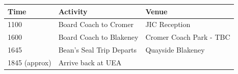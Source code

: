 \documentclass[12pt,]{book}
\theoremstyle{definition}
\theoremstyle{definition}
\theoremstyle{remark}
\begin{document}
\begin{longtable}[]{@{}lll@{}}
\toprule
\begin{minipage}[b]{0.18\columnwidth}\raggedright\strut
Time\strut
\end{minipage} & \begin{minipage}[b]{0.32\columnwidth}\raggedright\strut
Activity\strut
\end{minipage} & \begin{minipage}[b]{0.32\columnwidth}\raggedright\strut
Venue\strut
\end{minipage}\tabularnewline
\midrule
\endhead
\begin{minipage}[t]{0.18\columnwidth}\raggedright\strut
1100\strut
\end{minipage} & \begin{minipage}[t]{0.32\columnwidth}\raggedright\strut
Board Coach to Cromer\strut
\end{minipage} & \begin{minipage}[t]{0.32\columnwidth}\raggedright\strut
JIC Reception\strut
\end{minipage}\tabularnewline
\begin{minipage}[t]{0.18\columnwidth}\raggedright\strut
1600\strut
\end{minipage} & \begin{minipage}[t]{0.32\columnwidth}\raggedright\strut
Board Coach to Blakeney\strut
\end{minipage} & \begin{minipage}[t]{0.32\columnwidth}\raggedright\strut
Cromer Coach Park - TBC\strut
\end{minipage}\tabularnewline
\begin{minipage}[t]{0.18\columnwidth}\raggedright\strut
1645\strut
\end{minipage} & \begin{minipage}[t]{0.32\columnwidth}\raggedright\strut
Bean's Seal Trip Departs\strut
\end{minipage} & \begin{minipage}[t]{0.32\columnwidth}\raggedright\strut
Quayside Blakeney\strut
\end{minipage}\tabularnewline
\begin{minipage}[t]{0.18\columnwidth}\raggedright\strut
1845 (approx)\strut
\end{minipage} & \begin{minipage}[t]{0.32\columnwidth}\raggedright\strut
Arrive back at UEA\strut
\end{minipage} & \begin{minipage}[t]{0.32\columnwidth}\raggedright\strut
\strut
\end{minipage}\tabularnewline
\bottomrule
\end{longtable}
\end{document}
